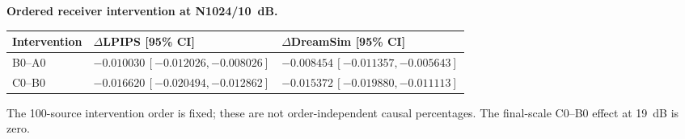 \textbf{Ordered receiver intervention at N1024/10~dB.}
\begin{center}\small\begin{tabular}{lll}\toprule
Intervention & $\Delta$LPIPS [95\% CI] & $\Delta$DreamSim [95\% CI]\\\midrule
B0--A0 & $-0.010030\,\allowbreak[-0.012026,-0.008026]$ & $-0.008454\,\allowbreak[-0.011357,-0.005643]$\\
C0--B0 & $-0.016620\,\allowbreak[-0.020494,-0.012862]$ & $-0.015372\,\allowbreak[-0.019880,-0.011113]$\\
\bottomrule\end{tabular}\end{center}
The 100-source intervention order is fixed; these are not order-independent causal percentages. The final-scale C0--B0 effect at 19~dB is zero.
